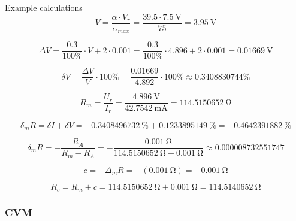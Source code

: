 Example calculations 
\begin{equation}
	 V = \frac{\alpha\cdot V_{r}}{\alpha_{max}} = \frac{39.5\cdot \SI{7.5}{\volt}}{75} = \SI{3.95}{\volt}
	 \label{eq:digital_indirect}
\end{equation}

\begin{equation}
	\Delta V = \frac{0.3}{100\unit{\percent}} \cdot V + 2 \cdot 0.001 = \frac{0.3}{100\unit{\percent}} \cdot 4.896 + 2 \cdot 0.001 = \SI{0.01669}{\volt}
	\label{eq:digital_indirect}
\end{equation}

\begin{equation}
	  \delta V = \frac{\Delta V}{V}\cdot 100\unit{\percent} = \frac{0.01669}{4.892}\cdot 100\unit{\percent} \approx 0.3408830744\unit{\percent}
	  \label{eq:digital_indirect}
\end{equation}

\begin{equation}
	R_m = \frac{U_r}{ I_r} = \frac{\SI{4.896}{\volt}} {\SI{42.7542}{\milli\ampere}} = \SI{114.5150652}{\ohm}
\label{eq:digital_indirect}
\end{equation}

\begin{equation}
	\delta_m R = \delta I + \delta V = -\SI{0.3408496732}{\percent} + \SI{0.1233895149}{\percent} = -\SI{0.4642391882}{\percent}
	\label{eq:digital_indirect}
\end{equation}

\begin{equation}
	\delta_m R = -\frac{R_A}{R_m - R_A} = -\frac{\SI{0.001}{\ohm}}{\SI{114.5150652}{\ohm} + \SI{0.001}{\ohm}} \approx 0.000008732551747
	\label{eq:digital_indirect}
\end{equation}

\begin{equation}
	c = -\Delta_m R = -(\SI{0.001}{\ohm}) = -\SI{0.001}{\ohm}
	\label{eq:digital_indirect}
\end{equation}

\begin{equation}
	R_c = R_m + c = \SI{114.5150652}{\ohm} + \SI{0.001}{\ohm} = \SI{114.5140652}{\ohm}
	\label{eq:analog_V_c}
\end{equation}

\subsubsection*{CVM}

